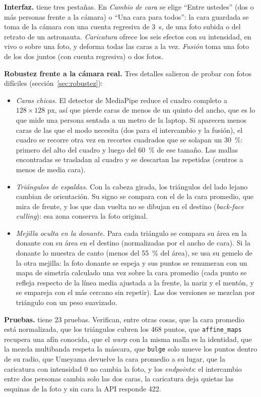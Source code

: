 \textbf{Interfaz.}  tiene tres pestañas. En \emph{Cambio de cara} se elige ``Entre ustedes'' (dos o más personas frente a la cámara) o ``Una cara para todos'': la cara guardada se toma de la cámara con una cuenta regresiva de 3~s, de una foto subida o del retrato de un astronauta. \emph{Caricatura} ofrece los seis efectos con su intensidad, en vivo o sobre una foto, y deforma todas las caras a la vez. \emph{Fusión} toma una foto de los dos juntos (con cuenta regresiva) o dos fotos.

\textbf{Robustez frente a la cámara real.}\label{sec:fiesta-robustez} Tres detalles salieron de probar con fotos difíciles (sección~\ref{sec:robustez}):
\begin{itemize}
  \item \emph{Caras chicas.} El detector de MediaPipe reduce el cuadro completo a $128\times128$ px, así que pierde caras de menos de un quinto del ancho, que es lo que mide una persona sentada a un metro de la laptop. Si aparecen menos caras de las que el modo necesita (dos para el intercambio y la fusión), el cuadro se recorre otra vez en recortes cuadrados que se solapan un 30~\%: primero del alto del cuadro y luego del 60~\% de ese tamaño. Las mallas encontradas se trasladan al cuadro y se descartan las repetidas (centros a menos de media cara).
  \item \emph{Triángulos de espaldas.} Con la cabeza girada, los triángulos del lado lejano cambian de orientación. Su signo se compara con el de la cara promedio, que mira de frente, y los que dan vuelta no se dibujan en el destino (\emph{back-face culling}): esa zona conserva la foto original.
  \item \emph{Mejilla oculta en la donante.} Para cada triángulo se compara su área en la donante con su área en el destino (normalizadas por el ancho de cara). Si la donante lo muestra de canto (menos del 55~\% del área), se usa su gemelo de la otra mejilla: la foto donante se espeja y sus puntos se renumeran con un mapa de simetría calculado una vez sobre la cara promedio (cada punto se refleja respecto de la línea media ajustada a la frente, la nariz y el mentón, y se empareja con el más cercano sin repetir). Las dos versiones se mezclan por triángulo con un peso suavizado.
\end{itemize}

\textbf{Pruebas.}  tiene 23 pruebas. Verifican, entre otras cosas, que la cara promedio está normalizada, que los triángulos cubren los 468 puntos, que \texttt{affine\_maps} recupera una afín conocida, que el \emph{warp} con la misma malla es la identidad, que la mezcla multibanda respeta la máscara, que \texttt{bulge} solo mueve los puntos dentro de su radio, que Umeyama devuelve la cara promedio a su lugar, que la caricatura con intensidad 0 no cambia la foto, y los \emph{endpoints}: el intercambio entre dos personas cambia solo las dos caras, la caricatura deja quietas las esquinas de la foto y sin cara la API responde 422.
